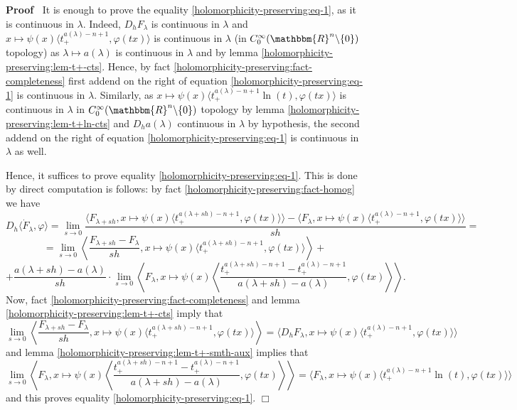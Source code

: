 \documentclass{article}
\renewenvironment{proof}{\noindent\textbf{Proof\ }}{\hspace*{\fill}$\Box$\medskip}
\theoremstyle{remark}
\begin{document}
\begin{proof}
  It is enough to prove the equality \ref{holomorphicity-preserving:eq-1}, as
  it is continuous in $\lambda$. Indeed, $D_h F_{\lambda}$ is continuous in
  $\lambda$ and $x \mapsto \psi (x) \langle t^{a (\lambda) - n + 1}_+, \varphi
  (t x) \rangle$ is continuous in $\lambda$ (in $C_0^{\infty} (\mathbbm{R}^n
  \backslash \{ 0 \})$ topology) as $\lambda \mapsto a (\lambda)$ is
  continuous in $\lambda$ and by lemma
  \ref{holomorphicity-preserving:lem-t+-cts}. Hence, by fact
  \ref{holomorphicity-preserving:fact-completeness} first addend on the right
  of equation \ref{holomorphicity-preserving:eq-1} is continuous in $\lambda$.
  Similarly, as $x \mapsto \psi (x) \langle t_+^{a (\lambda) - n + 1} \ln (t),
  \varphi (t x) \rangle$ is continuous in $\lambda$ in $C_0^{\infty}
  (\mathbbm{R}^n \backslash \{ 0 \})$ topology by lemma
  \ref{holomorphicity-preserving:lem-t+ln-cts} and $D_h a (\lambda)$
  continuous in $\lambda$ by hypothesis, the second addend on the right of
  equation \ref{holomorphicity-preserving:eq-1} is continuous in $\lambda$ as
  well.
  
  Hence, it suffices to prove equality \ref{holomorphicity-preserving:eq-1}.
  This is done by direct computation is follows: by fact
  \ref{holomorphicity-preserving:fact-homog} we have
  \[ D_h \langle \dot{F}_{\lambda}, \varphi \rangle = \lim_{s \rightarrow 0}
     \frac{\langle F_{\lambda + s h}, x \mapsto \psi (x) \langle t^{a (\lambda
     + s h) - n + 1}_+, \varphi (t x) \rangle \rangle - \langle F_{\lambda}, x
     \mapsto \psi (x) \langle t^{a (\lambda) - n + 1}_+, \varphi (t x) \rangle
     \rangle}{s h} = \]
  \[ = \lim_{s \rightarrow 0} \left\langle \frac{F_{\lambda + s h} -
     F_{\lambda}}{s h}, x \mapsto \psi (x) \langle t^{a (\lambda + s h) - n +
     1}_+, \varphi (t x) \rangle \right\rangle + \]
  \[ + \frac{a (\lambda + s h) - a (\lambda)}{s h} \cdot \lim_{s \rightarrow
     0} \left\langle F_{\lambda}, x \mapsto \psi (x) \left\langle \frac{t^{a
     (\lambda + s h) - n + 1}_+ - t^{a (\lambda) - n + 1}_+}{a (\lambda + s h)
     - a (\lambda)}, \varphi (t x) \right\rangle \right\rangle . \]
  Now, fact \ref{holomorphicity-preserving:fact-completeness} and lemma
  \ref{holomorphicity-preserving:lem-t+-cts} imply that
  \[ \lim_{s \rightarrow 0} \left\langle \frac{F_{\lambda + s h} -
     F_{\lambda}}{s h}, x \mapsto \psi (x) \langle t^{a (\lambda + s h) - n +
     1}_+, \varphi (t x) \rangle \right\rangle = \langle D_h F_{\lambda}, x
     \mapsto \psi (x) \langle t^{a (\lambda) - n + 1}_+, \varphi (t x) \rangle
     \rangle \]
  and lemma \ref{holomorphicity-preserving:lem-t+-smth-aux} implies that
  \[ \lim_{s \rightarrow 0} \left\langle F_{\lambda}, x \mapsto \psi (x)
     \left\langle \frac{t^{a (\lambda + s h) - n + 1}_+ - t^{a (\lambda) - n +
     1}_+}{a (\lambda + s h) - a (\lambda)}, \varphi (t x) \right\rangle
     \right\rangle = \langle F_{\lambda}, x \mapsto \psi (x) \langle t_+^{a
     (\lambda) - n + 1} \ln (t), \varphi (t x) \rangle \rangle \]
  and this proves equality \ref{holomorphicity-preserving:eq-1}.
\end{proof}
\end{document}

